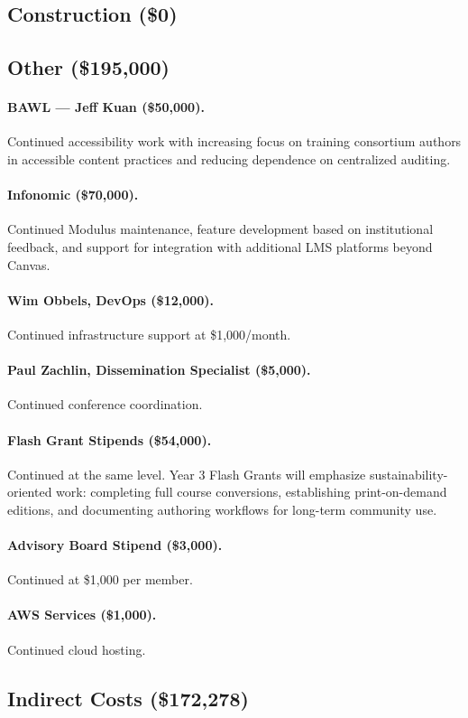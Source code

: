 \documentclass[12pt,letterpaper]{article}
\newcommand{\budgetcat}[1]{\subsection*{#1}}
\begin{document}
\budgetcat{Construction (\$0)}

\budgetcat{Other (\$195,000)}

\paragraph{BAWL --- Jeff Kuan (\$50,000).} Continued accessibility work with increasing focus on training consortium authors in accessible content practices and reducing dependence on centralized auditing.

\paragraph{Infonomic (\$70,000).} Continued Modulus maintenance, feature development based on institutional feedback, and support for integration with additional LMS platforms beyond Canvas.

\paragraph{Wim Obbels, DevOps (\$12,000).} Continued infrastructure support at \$1,000/month.

\paragraph{Paul Zachlin, Dissemination Specialist (\$5,000).} Continued conference coordination.

\paragraph{Flash Grant Stipends (\$54,000).} Continued at the same level. Year 3 Flash Grants will emphasize sustainability-oriented work: completing full course conversions, establishing print-on-demand editions, and documenting authoring workflows for long-term community use.

\paragraph{Advisory Board Stipend (\$3,000).} Continued at \$1,000 per member.

\paragraph{AWS Services (\$1,000).} Continued cloud hosting.

\budgetcat{Indirect Costs (\$172,278)}
\end{document}
